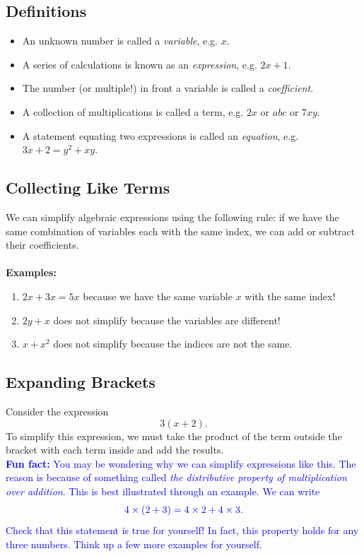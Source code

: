 \documentclass{article}
\begin{document}
\subsection{Definitions}

\begin{itemize}
    \item An unknown number is called a \textit{variable}, e.g. \(x\).
    \item A series of calculations is known as an \textit{expression}, e.g. \(2x+1\).
    \item The number (or multiple!) in front a variable is called a \textit{coefficient}.
    \item A collection of multiplications is called a term, e.g. \(2x\) or \(abc\) or \(7xy\).
    \item A statement equating two expressions is called an \textit{equation}, e.g. \(3x+2 = y^2 + xy\).
\end{itemize}

\subsection{Collecting Like Terms}

We can simplify algebraic expressions using the following rule: if we have the same combination of variables each with the same index, we can add or subtract their coefficients.
\\
\\
\textbf{Examples:}

\begin{enumerate}
    \item \(2x + 3x = 5x\) because we have the same variable \(x\) with the same index!
    \item \(2y + x\) does not simplify because the variables are different!
    \item \(x + x^2\) does not simplify because the indices are not the same.
\end{enumerate}

\subsection{Expanding Brackets}

Consider the expression 
\[
3(x+2).
\]
To simplify this expression, we must take the product of the term outside the bracket with each term inside and add the results.
\\

\textcolor{blue}{\textbf{Fun fact:} You may be wondering why we can simplify expressions like this. The reason is because of something called \textit{the distributive property of multiplication over addition}. This is best illustrated through an example. We can write}
\[
\color{blue}
4 \times (2+3) = 4\times2 + 4\times3.
\]
\textcolor{blue}{Check that this statement is true for yourself! In fact, this property holds for any three numbers. Think up a few more examples for yourself.} \\
\end{document}
